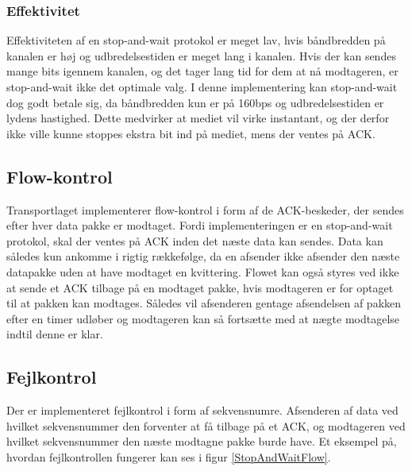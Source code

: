 \subsubsection{Effektivitet}
Effektiviteten af en stop-and-wait protokol er meget lav, hvis båndbredden på kanalen er høj og udbredelsestiden er meget lang i kanalen. Hvis der kan sendes mange bits igennem kanalen, og det tager lang tid for dem at nå modtageren, er stop-and-wait ikke det optimale valg. I denne implementering kan stop-and-wait dog godt betale sig, da båndbredden kun er på 160bps og udbredelsestiden er lydens hastighed. Dette medvirker at mediet vil virke instantant, og der derfor ikke ville kunne stoppes ekstra bit ind på mediet, mens der ventes på ACK.

\subsection{Flow-kontrol}
Transportlaget implementerer flow-kontrol i form af de ACK-beskeder, der sendes efter hver data pakke er modtaget. Fordi implementeringen er en stop-and-wait protokol, skal der ventes på ACK inden det næste data kan sendes. Data kan således kun ankomme i rigtig rækkefølge, da en afsender ikke afsender den næste datapakke uden at have modtaget en kvittering. Flowet kan også styres ved ikke at sende et ACK tilbage på en modtaget pakke, hvis modtageren er for optaget til at pakken kan modtages. Således vil afsenderen gentage afsendelsen af pakken efter en timer udløber og modtageren kan så fortsætte med at nægte modtagelse indtil denne er klar.

\subsection{Fejlkontrol}
Der er implementeret fejlkontrol i form af sekvensnumre. Afsenderen af data ved hvilket sekvensnummer den forventer at få tilbage på et ACK, og modtageren ved hvilket sekvensnummer den næste modtagne pakke burde have. Et eksempel på, hvordan fejlkontrollen fungerer kan ses i figur \ref{StopAndWaitFlow}.

